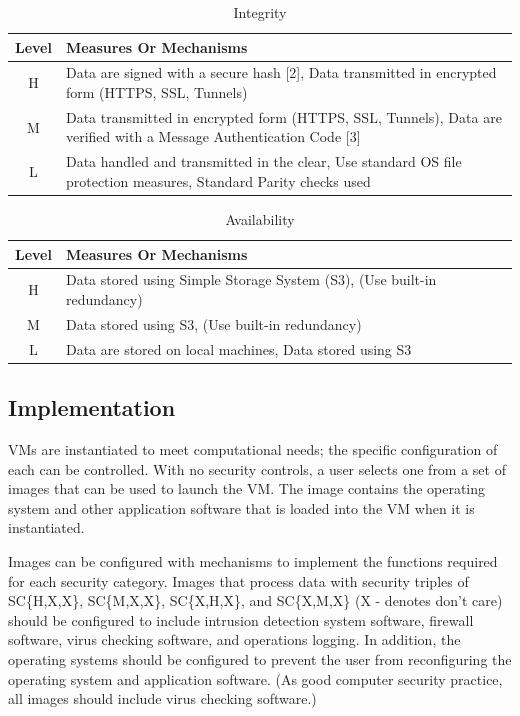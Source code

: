 \documentclass{sig-alternate}
\begin{document}
\begin{table}[ht]
\begin{tabular}{|c|p{2.5in}|}
\hline
Level &  Measures Or Mechanisms \\
\hline
H & Data are signed with a secure hash [2],
    Data transmitted in encrypted form (HTTPS, SSL, Tunnels)\\
\hline
M & Data transmitted in encrypted form (HTTPS, SSL, Tunnels),
    Data are verified with a Message Authentication Code [3]\\
\hline
L & Data handled and transmitted in the clear,
    Use standard OS file protection measures, 
    Standard Parity checks used\\
\hline
\end{tabular}
\caption{Integrity}
\end{table}

\begin{table}[ht]
\begin{tabular}{|c|p{2.5in}|}
\hline
Level &  Measures Or Mechanisms \\
\hline
H & Data stored using Simple Storage System (S3),
    (Use built-in redundancy) \\
\hline  
M & Data stored using S3,
    (Use built-in redundancy)\\
\hline
L & Data are stored on local machines,
    Data stored using S3 \\
\hline
\end{tabular}  
\caption{Availability}
\end{table}

\subsection{Implementation}
VMs are instantiated to meet computational needs; the specific configuration of each can be controlled.  With no security controls, a user selects one from a set of images that can be used to launch the VM.  The image contains the operating system and other application software that is loaded into the VM when it is instantiated. 
 
Images can be configured with mechanisms to implement the functions required for each security category.  Images that process data with security triples of  SC\{H,X,X\}, SC\{M,X,X\}, SC\{X,H,X\}, and SC\{X,M,X\} (X - denotes don't care) should be configured to include intrusion detection system software, firewall software, virus checking software, and operations logging.  In addition, the operating systems should be configured to prevent the user from reconfiguring the operating system and application software.   (As good computer security practice, all images should include virus checking software.)
 
\end{document}
